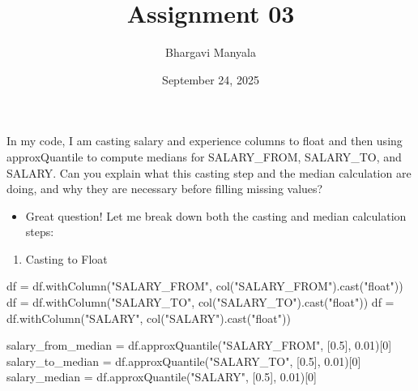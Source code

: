 \documentclass[
  letterpaper,
  DIV=11,
  numbers=noendperiod]{scrartcl}
\title{Assignment 03}
\author{Bhargavi Manyala}
\date{September 24, 2025}
\newenvironment{Shaded}{\begin{snugshade}}{\end{snugshade}}
\newcommand{\DecValTok}[1]{\textcolor[rgb]{0.68,0.00,0.00}{#1}}
\newcommand{\FloatTok}[1]{\textcolor[rgb]{0.68,0.00,0.00}{#1}}
\newcommand{\NormalTok}[1]{\textcolor[rgb]{0.00,0.23,0.31}{#1}}
\newcommand{\OperatorTok}[1]{\textcolor[rgb]{0.37,0.37,0.37}{#1}}
\newcommand{\StringTok}[1]{\textcolor[rgb]{0.13,0.47,0.30}{#1}}
\providecommand{\tightlist}{%
  \setlength{\itemsep}{0pt}\setlength{\parskip}{0pt}}\usepackage{longtable,booktabs,array}
\begin{document}
\maketitle


\begin{tcolorbox}[enhanced jigsaw, colback=white, leftrule=.75mm, toprule=.15mm, arc=.35mm, breakable, left=2mm, bottomrule=.15mm, colframe=quarto-callout-color-frame, opacityback=0, rightrule=.15mm]

In my code, I am casting salary and experience columns to float and then
using approxQuantile to compute medians for SALARY\_FROM, SALARY\_TO,
and SALARY. Can you explain what this casting step and the median
calculation are doing, and why they are necessary before filling missing
values?

\end{tcolorbox}

\begin{itemize}
\tightlist
\item
  Great question! Let me break down both the casting and median
  calculation steps:
\end{itemize}

\begin{enumerate}
\def\labelenumi{\arabic{enumi}.}
\tightlist
\item
  Casting to Float
\end{enumerate}

\begin{Shaded}
\begin{Highlighting}[]
\NormalTok{df }\OperatorTok{=}\NormalTok{ df.withColumn(}\StringTok{"SALARY\_FROM"}\NormalTok{, col(}\StringTok{"SALARY\_FROM"}\NormalTok{).cast(}\StringTok{"float"}\NormalTok{))}
\NormalTok{df }\OperatorTok{=}\NormalTok{ df.withColumn(}\StringTok{"SALARY\_TO"}\NormalTok{, col(}\StringTok{"SALARY\_TO"}\NormalTok{).cast(}\StringTok{"float"}\NormalTok{))}
\NormalTok{df }\OperatorTok{=}\NormalTok{ df.withColumn(}\StringTok{"SALARY"}\NormalTok{, col(}\StringTok{"SALARY"}\NormalTok{).cast(}\StringTok{"float"}\NormalTok{))}

\NormalTok{salary\_from\_median }\OperatorTok{=}\NormalTok{ df.approxQuantile(}\StringTok{"SALARY\_FROM"}\NormalTok{, [}\FloatTok{0.5}\NormalTok{], }\FloatTok{0.01}\NormalTok{)[}\DecValTok{0}\NormalTok{]}
\NormalTok{salary\_to\_median }\OperatorTok{=}\NormalTok{ df.approxQuantile(}\StringTok{"SALARY\_TO"}\NormalTok{, [}\FloatTok{0.5}\NormalTok{], }\FloatTok{0.01}\NormalTok{)[}\DecValTok{0}\NormalTok{]}
\NormalTok{salary\_median }\OperatorTok{=}\NormalTok{ df.approxQuantile(}\StringTok{"SALARY"}\NormalTok{, [}\FloatTok{0.5}\NormalTok{], }\FloatTok{0.01}\NormalTok{)[}\DecValTok{0}\NormalTok{]}
\end{Highlighting}
\end{Shaded}
\end{document}
